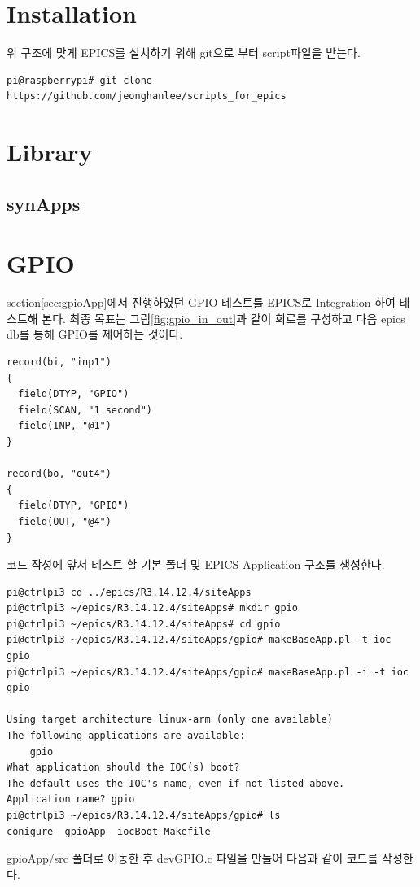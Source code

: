\documentclass[11pt
  , a4paper
  , article
  , oneside
]{memoir}
\begin{document}
\section{Installation}
위 구조에 맞게 EPICS를 설치하기 위해 git으로 부터 script파일을 받는다.
\begin{lstlisting}[style=termstyle]
pi@raspberrypi# git clone https://github.com/jeonghanlee/scripts_for_epics
\end{lstlisting}
\section{Library}
\subsection{synApps}

\section{GPIO}
section\ref{sec:gpioApp}에서 진행하였던 GPIO 테스트를 EPICS로 Integration 하여 테스트해 본다. 최종 목표는
그림\ref{fig:gpio_in_out}과 같이 회로를 구성하고 다음 epics db를 통해 GPIO를 제어하는 것이다.
\begin{lstlisting}[style=termstyle]
record(bi, "inp1")
{
  field(DTYP, "GPIO")
  field(SCAN, "1 second")
  field(INP, "@1")
}

record(bo, "out4")
{
  field(DTYP, "GPIO")
  field(OUT, "@4")
}
\end{lstlisting}
코드 작성에 앞서 테스트 할 기본 폴더 및 EPICS Application 구조를 생성한다.
\begin{lstlisting}[style=termstyle]
pi@ctrlpi3 cd ../epics/R3.14.12.4/siteApps
pi@ctrlpi3 ~/epics/R3.14.12.4/siteApps# mkdir gpio
pi@ctrlpi3 ~/epics/R3.14.12.4/siteApps# cd gpio
pi@ctrlpi3 ~/epics/R3.14.12.4/siteApps/gpio# makeBaseApp.pl -t ioc gpio
pi@ctrlpi3 ~/epics/R3.14.12.4/siteApps/gpio# makeBaseApp.pl -i -t ioc gpio

Using target architecture linux-arm (only one available)
The following applications are available:
    gpio
What application should the IOC(s) boot?
The default uses the IOC's name, even if not listed above.
Application name? gpio
pi@ctrlpi3 ~/epics/R3.14.12.4/siteApps/gpio# ls
conigure  gpioApp  iocBoot Makefile
\end{lstlisting}
gpioApp/src 폴더로 이동한 후 devGPIO.c 파일을 만들어 다음과 같이 코드를 작성한다.
\end{document}
